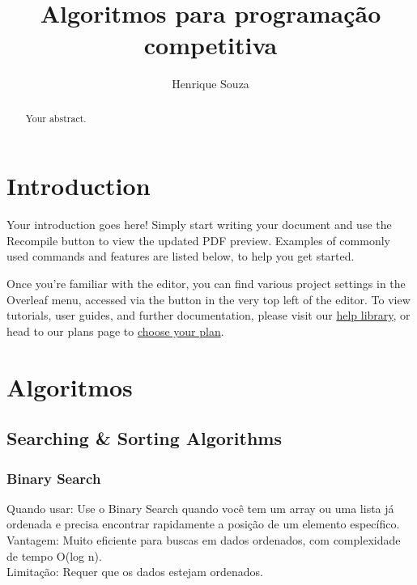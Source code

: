 \documentclass{article}
\title{Algoritmos para programação competitiva}
\author{Henrique Souza}
\begin{document}
\maketitle

\begin{abstract}
Your abstract.
\end{abstract}

\section{Introduction}

Your introduction goes here! Simply start writing your document and use the Recompile button to view the updated PDF preview. Examples of commonly used commands and features are listed below, to help you get started.

Once you're familiar with the editor, you can find various project settings in the Overleaf menu, accessed via the button in the very top left of the editor. To view tutorials, user guides, and further documentation, please visit our \href{https://www.overleaf.com/learn}{help library}, or head to our plans page to \href{https://www.overleaf.com/user/subscription/plans}{choose your plan}.

\section{Algoritmos}

\subsection{Searching \& Sorting Algorithms}

\subsubsection{Binary Search}

Quando usar: Use o Binary Search quando você tem um array ou uma lista já ordenada e precisa encontrar rapidamente a posição de um elemento específico.
\\Vantagem: Muito eficiente para buscas em dados ordenados, com complexidade de tempo O(log n).
\\Limitação: Requer que os dados estejam ordenados.
\end{document}
